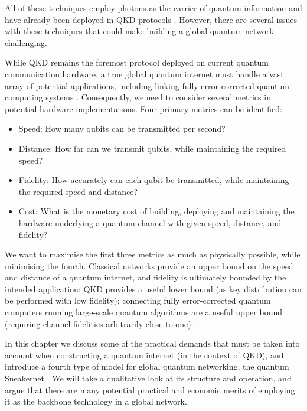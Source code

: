 \documentclass[twocolumn, aps, rmp, amsmath, amssymb, nofootinbib, superscriptaddress, longbibliography, floatfix, table-of-contents, eqsecnum]{revtex4-2}
\begin{document}
All of these techniques employ photons as the carrier of quantum information and have already been deployed in QKD protocols \cite{SD-Schmitt-Manderbach:2007aa, SD-Peev:2009aa, SD-Liao:2017aa}. However, there are several issues with these techniques that could make building a global quantum network challenging.

While QKD remains the foremost protocol deployed on current quantum communication hardware, a true global quantum internet must handle a vast array of potential applications, including linking fully error-corrected quantum computing systems \cite{SD-Devitt2011,SD-Fitzsimons:2017aa}. Consequently, we need to consider several metrics in potential hardware implementations. Four primary metrics can be identified:
\begin{itemize}
\item Speed: How many qubits can be transmitted per second?
\item Distance: How far can we transmit qubits, while maintaining the required speed?
\item Fidelity: How accurately can each qubit be transmitted, while maintaining the required speed and distance?
\item Cost: What is the monetary cost of building, deploying and maintaining the hardware underlying a quantum channel with given speed, distance, and fidelity?
\end{itemize}

We want to maximise the first three metrics as much as physically possible, while minimising the fourth. Classical networks provide an upper bound on the speed and distance of a quantum internet, and fidelity is ultimately bounded by the intended application: QKD provides a useful lower bound (as key distribution can be performed with low fidelity); connecting fully error-corrected quantum computers running large-scale quantum algorithms are a useful upper bound (requiring channel fidelities arbitrarily close to one).

In this chapter we discuss some of the practical demands that must be taken into account when constructing a quantum internet (in the context of QKD), and introduce a fourth type of model for global quantum networking, the quantum Sneakernet \cite{SD-Devitt:2016aa}. We will take a qualitative look at its structure and operation, and argue that there are many potential practical and economic merits of employing it as the backbone technology in a global network.

\end{document}
